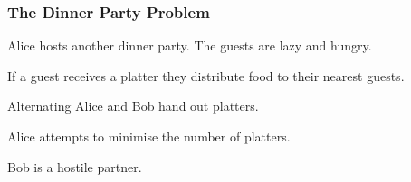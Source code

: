 \documentclass{beamer}
\begin{document}
\begin{frame}
    \frametitle{The Dinner Party Problem}
    Alice hosts another dinner party. The guests are lazy and hungry.     
    
    \bigskip
    \pause
    
    If a guest receives a platter they distribute food to their nearest guests.
    
    \bigskip
    \pause
    
    Alternating Alice and Bob hand out platters.
    
    \bigskip
    \pause
    
    Alice attempts to minimise the number of platters. 
    
    \bigskip
    \pause
    
    Bob is a hostile partner.
\end{frame}
\end{document}
